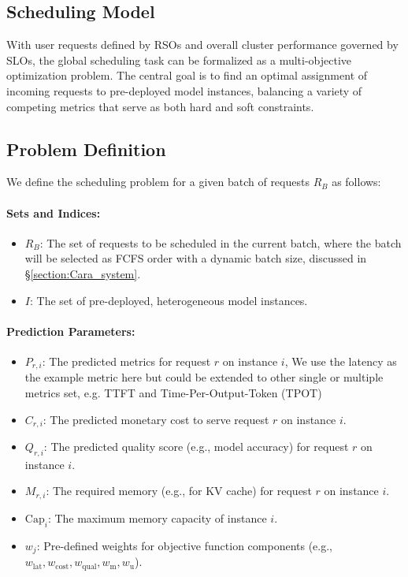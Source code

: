 \documentclass[letterpaper, anonymous, twocolumn, 10pt]{article}
\begin{document}
\subsection{Scheduling Model} \label{section:system_model}

With user requests defined by RSOs and overall cluster performance governed by SLOs, the global scheduling task can be formalized as a multi-objective optimization problem. The central goal is to find an optimal assignment of incoming requests to pre-deployed model instances, balancing a variety of competing metrics that serve as both hard and soft constraints.

\subsection{Problem Definition}
We define the scheduling problem for a given batch of requests $R_B$ as follows:

\paragraph{Sets and Indices:}
\begin{itemize}
    \item $R_B$: The set of requests to be scheduled in the current batch, where the batch will be selected as FCFS order with a dynamic batch size, discussed in \S \ref{section:Cara_system}.
    \item $I$: The set of pre-deployed, heterogeneous model instances.
\end{itemize}

\paragraph{Prediction Parameters:}
\begin{itemize}
    \item $P_{r,i}$: The predicted metrics for request $r$ on instance $i$, 
    We use the latency as the example metric here but could be extended to other single or multiple metrics set, e.g. TTFT and Time-Per-Output-Token  (TPOT)
    \item $C_{r,i}$: The predicted monetary cost to serve request $r$ on instance $i$.
    \item $Q_{r,i}$: The predicted quality score (e.g., model accuracy) for request $r$ on instance $i$.
    \item $M_{r,i}$: The required memory (e.g., for KV cache) for request $r$ on instance $i$.
    \item $\mathrm{Cap}_i$: The maximum memory capacity of instance $i$.
    \item $w_j$: Pre-defined weights for objective function components (e.g., $w_{\text{lat}}, w_{\text{cost}}, w_{\text{qual}}, w_{\text{m}}, w_{\text{u}}$).
\end{itemize}
\end{document}
